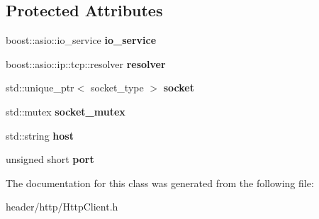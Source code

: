 \subsection*{Protected Attributes}
\begin{DoxyCompactItemize}
\item 
\mbox{\label{classhttp_1_1_client_base_ae05a4e6734fc913d0c8072950c580371}} 
boost\+::asio\+::io\+\_\+service {\bfseries io\+\_\+service}
\item 
\mbox{\label{classhttp_1_1_client_base_aeafcca58376a64522dd0b17300097926}} 
boost\+::asio\+::ip\+::tcp\+::resolver {\bfseries resolver}
\item 
\mbox{\label{classhttp_1_1_client_base_ae9194e0064360446237a43056df0d881}} 
std\+::unique\+\_\+ptr$<$ socket\+\_\+type $>$ {\bfseries socket}
\item 
\mbox{\label{classhttp_1_1_client_base_a57456c0e9ef28f44f7ba69c0539e80da}} 
std\+::mutex {\bfseries socket\+\_\+mutex}
\item 
\mbox{\label{classhttp_1_1_client_base_abfc8afff192657d6526e209d85c64698}} 
std\+::string {\bfseries host}
\item 
\mbox{\label{classhttp_1_1_client_base_af99a277d82044059d66db06dbb38cf16}} 
unsigned short {\bfseries port}
\end{DoxyCompactItemize}


The documentation for this class was generated from the following file\+:\begin{DoxyCompactItemize}
\item 
header/http/Http\+Client.\+h\end{DoxyCompactItemize}
